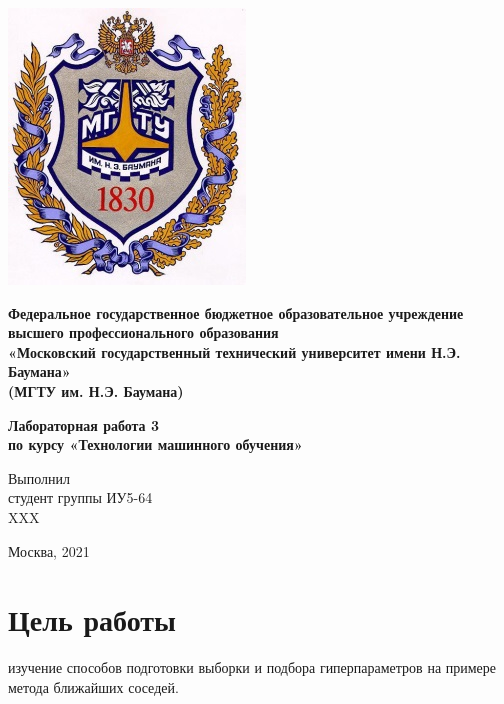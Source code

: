\documentclass[a4paper]{article}
\begin{document}
  \fontsize{14}{16}\selectfont

  \begin{titlepage}
    \begin{minipage}{0.2\textwidth}
      \includegraphics[scale=0.4]{logo}
    \end{minipage}
    \begin{minipage}{0.7\textwidth}\centering
      \fontsize{10}{12}\selectfont
      \textbf{
        Федеральное государственное бюджетное образовательное учреждение \\
        высшего профессионального образования \\
        «Московский государственный технический университет имени Н.Э. Баумана» \\
        (МГТУ им. Н.Э. Баумана)
      }
    \end{minipage}

    \vspace{5cm}
    \centering
    \textbf{
      Лабораторная работа 3 \\
      по курсу «Технологии машинного обучения» \\
    }

    \vspace{5cm}
    \begin{flushright}
    Выполнил \\
    студент группы ИУ5-64 \\
    XXX
    \end{flushright}
    \vspace*{\fill}
    Москва, 2021
  \end{titlepage}

  \section*{Цель работы}
  изучение способов подготовки выборки и подбора гиперпараметров на примере метода ближайших соседей.
\end{document}

